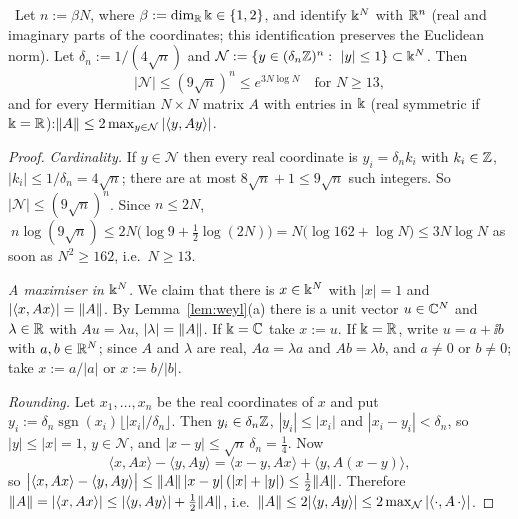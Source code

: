 \begin{lemma}\label{lem:net} \infra\
Let $n:=\beta N$, where $\beta:=\dim_{\mathbb{R}}\Bbbk\in\{1,2\}$, and identify $\Bbbk^N$ with $\mathbb{R}^{n}$ (real and imaginary parts of the coordinates; this identification preserves the Euclidean norm).
Let $\delta_n:=1/(4\sqrt n)$ and $\mathcal N:=\{y\in(\delta_n\Z)^n:\ |y|\le1\}\subset\kk^N$. Then
\[
 |\mathcal N|\le(9\sqrt n)^n\le e^{3N\log N}\quad\text{for }N\ge13,
\]
and for every Hermitian $N\times N$ matrix $A$ with entries in $\Bbbk$ (real symmetric if $\Bbbk=\mathbb{R}$):\quad$\|A\|\le2\max_{y\in\mathcal N}|\langle y,Ay\rangle|$.
\end{lemma}
\begin{proof}
\emph{Cardinality.} If $y\in\mathcal N$ then every real coordinate is $y_i=\delta_nk_i$ with $k_i\in\mathbb{Z}$, $|k_i|\le1/\delta_n=4\sqrt n$; there are at most $8\sqrt n+1\le9\sqrt n$ such integers. So $|\mathcal N|\le(9\sqrt n)^n$.
Since $n\le2N$, $\ n\log(9\sqrt n)\le2N\big(\log9+\tfrac12\log(2N)\big)=N\big(\log162+\log N\big)\le3N\log N$ as soon as $N^2\ge162$, i.e.\ $N\ge13$.

\emph{A maximiser in $\Bbbk^N$.} We claim that there is $x\in\Bbbk^N$ with $|x|=1$ and $|\langle x,Ax\rangle|=\|A\|$. By Lemma~\ref{lem:weyl}(a) there is a unit vector $u\in\mathbb{C}^N$ and $\lambda\in\mathbb{R}$ with $Au=\lambda u$, $|\lambda|=\|A\|$.
If $\Bbbk=\mathbb{C}$ take $x:=u$. If $\Bbbk=\mathbb{R}$, write $u=a+\ii b$ with $a,b\in\mathbb{R}^N$; since $A$ and $\lambda$ are real, $Aa=\lambda a$ and $Ab=\lambda b$, and $a\ne0$ or $b\ne0$; take $x:=a/|a|$ or $x:=b/|b|$.

\emph{Rounding.} Let $x_1,\dots,x_n$ be the real coordinates of $x$ and put $y_i:=\delta_n\operatorname{sgn}(x_i)\lfloor|x_i|/\delta_n\rfloor$. Then $y_i\in\delta_n\mathbb{Z}$, $|y_i|\le|x_i|$ and $|x_i-y_i|<\delta_n$, so
$|y|\le|x|=1$, $y\in\mathcal N$, and $|x-y|\le\sqrt n\,\delta_n=\frac14$. Now
\[
 \langle x,Ax\rangle-\langle y,Ay\rangle=\langle x-y,Ax\rangle+\langle y,A(x-y)\rangle,
\]
so $\big|\langle x,Ax\rangle-\langle y,Ay\rangle\big|\le\|A\|\,|x-y|\,(|x|+|y|)\le\tfrac12\|A\|$.
Therefore $\|A\|=|\langle x,Ax\rangle|\le|\langle y,Ay\rangle|+\frac12\|A\|$, i.e.\ $\|A\|\le2|\langle y,Ay\rangle|\le2\max_{\mathcal N}|\langle\cdot,A\,\cdot\rangle|$.
\end{proof}
